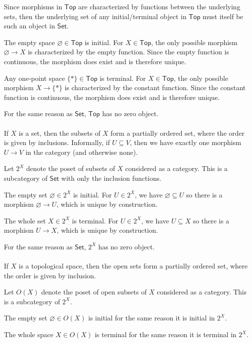 \documentclass[12pt]{article}
\newlength{\myparskip}
\newenvironment{fullbox}{\begin{lrbox}{\savefullbox}\begin{minipage}{\dimexpr\textwidth-2\fboxsep\relax}\setlength{\parskip}{\myparskip}}{\end{minipage}\end{lrbox}\framebox[\textwidth]{\usebox{\savefullbox}}}
\newenvironment{pbox}[1][]{\begin{fullbox}\ifx#1\empty\else\paragraph{#1}\phantom{}\fi}{\end{fullbox}}
\theoremstyle{definition}
\renewcommand{\emptyset}{\varnothing}
\newcommand{\<}{\langle}
\renewcommand{\>}{\rangle}
\newcommand{\Set}{\mathsf{Set}}
\newcommand{\Top}{\mathsf{Top}}
\begin{document}
Since morphisms in $\Top$ are characterized by functions between the underlying sets, then the underlying set of any initial/terminal object in $\Top$ must itself be such an object in $\Set$.

The empty space $\emptyset \in \Top$ is initial.
For $X \in \Top$, the only possible morphism $\emptyset \to X$ is characterized by the empty function.
Since the empty function is continuous, the morphism does exist and is therefore unique.

Any one-point space $\{*\} \in \Top$ is terminal.
For $X \in \Top$, the only possible morphism $X \to \{*\}$ is characterized by the constant function.
Since the constant function is continuous, the morphism does exist and is therefore unique.

For the same reason as $\Set$, $\Top$ has no zero object.

\begin{pbox}
    If $X$ is a set, then the subsets of $X$ form a partially ordered set, where the order is given by inclusions.
    Informally, if $U \subseteq V$, then we have exactly one morphism $U \to V$ in the category (and otherwise none).
\end{pbox}

Let $2^X$ denote the poset of subsets of $X$ considered as a category. This is a subcategory of $\Set$ with only the inclusion functions.

The empty set $\emptyset \in 2^X$ is initial.
For $U \in 2^X$, we have $\emptyset \subseteq U$ so there is a morphism $\emptyset \to U$, which is unique by construction.

The whole set $X \in 2^X$ is terminal.
For $U \in 2^X$, we have $U \subseteq X$ so there is a morphism $U \to X$, which is unique by construction.

For the same reason as $\Set$, $2^X$ has no zero object.

\begin{pbox}
    If $X$ is a topological space, then the open sets form a partially ordered set, where the order is given by inclusion.
\end{pbox}

Let $O(X)$ denote the poset of open subsets of $X$ considered as a category. This is a subcategory of $2^X$.

The empty set $\emptyset \in O(X)$ is initial for the same reason it is initial in $2^X$.

The whole space $X \in O(X)$ is terminal for the same reason it is terminal in $2^X$.
\end{document}
